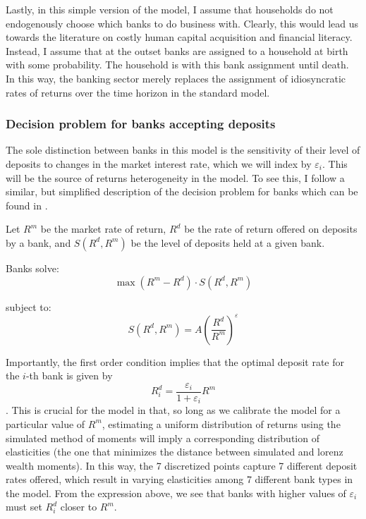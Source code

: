 \par Lastly, in this simple version of the model, I assume that households do not endogenously choose which banks to do business with. Clearly, this would lead us towards the literature on costly human capital acquisition and financial literacy. Instead, I assume that at the outset banks are assigned to a household at birth with some probability. The household is  with this bank assignment until death. In this way, the banking sector merely replaces the assignment of idiosyncratic rates of returns over the time horizon in the standard model. 

\subsubsection{Decision problem for banks accepting deposits}

\par The sole distinction between banks in this model is the sensitivity of their level of deposits to changes in the market interest rate, which we will index by $\varepsilon_i$. This will be the source of returns heterogeneity in the model. To see this, I follow a similar, but simplified description of the decision problem for banks which can be found in \cite{Paul2024}.

 \par Let $R^m$ be the market rate of return, $R^d$ be the rate of return offered on deposits by a  bank, and $S(R^d, R^m)$ be the level of deposits held at a given bank.

\par Banks solve:
\[
\max (R^m - R^d) \cdot S(R^d, R^m)
\]

\par subject to:
\[
S(R^d, R^m) = A \left( \frac{R^d}{R^m} \right)^{\varepsilon}
\]

\par Importantly, the first order condition implies that the optimal deposit rate for the $i$-th bank is given by $$ R_i^d = \frac{\varepsilon_i}{1+\varepsilon_i} R^m  $$. This is crucial for the model in that, so long as we calibrate the model for a particular value of $R^m$, estimating a uniform distribution of returns using the simulated method of moments will imply a corresponding distribution of elasticities (the one that minimizes the distance between simulated and lorenz wealth moments). In this way, the 7 discretized points capture 7 different deposit rates offered, which result in varying elasticities among 7 different bank types in the model. From the expression above, we see that banks with higher values of $\varepsilon_i$  must set $R_i^d$ closer to $R^m$.

